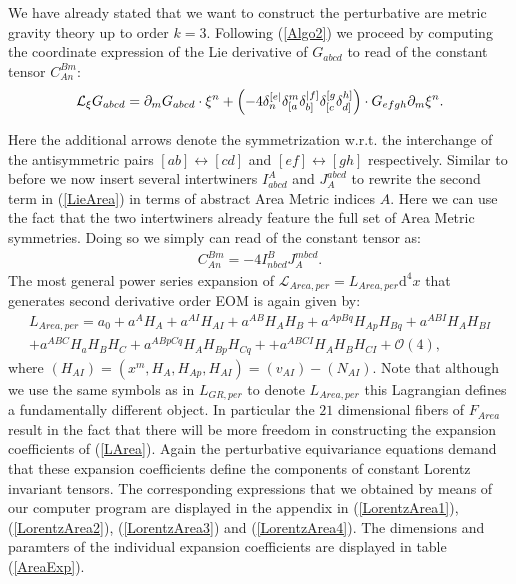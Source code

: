 \documentclass[a4paper,12pt, DIV=14, BCOR=5mm, twoside, headsepline, numbers=noenddot]{scrbook}
\newcommand{\mathnode}[1]{%
   \mathord{\tikz[baseline=(#1.base), inner sep = 0pt]{\node (#1) {$\scriptstyle{#1}$};}}}
\begin{document}
We have already stated that we want to construct the perturbative are metric gravity theory up to order $k=3$. Following (\ref{Algo2}) we proceed by computing the coordinate expression of the Lie derivative of $G_{abcd}$ to read of the constant tensor $C_{An}^{Bm}$:
\begin{align}\label{LieArea}
    \mathcal{L}_{\xi} G_{abcd} = \partial_m G_{abcd} \cdot \xi^n + \left (-4 \delta_n^{[e\vert} \delta_{[\mathnode{a}}^m \delta_{b]}^{\vert \mathnode{f} ]} \delta_{[c}^{[g} \delta_{\mathnode{d}]}^{\mathnode{h}]} \right ) \cdot G_{efgh} \partial_m \xi^n.
\end{align}
Here the additional arrows denote the symmetrization w.r.t. the interchange of the antisymmetric pairs $[ab] \leftrightarrow [cd]$ and $[ef] \leftrightarrow [gh]$ respectively.
%
%
%
Similar to before we now insert several intertwiners $I^A_{abcd}$ and $J_A^{abcd}$ to rewrite the second term in (\ref{LieArea}) in terms of abstract Area Metric indices $A$. Here we can use the fact that the two intertwiners already feature the full set of Area Metric symmetries.  Doing so we simply can read of the constant tensor as:
\begin{align}\label{areaGotayMInter}
    C_{An}^{Bm} = -4 I^B_{nbcd} J_A^{mbcd}.
\end{align}
The most general power series expansion of $\mathcal{L}_{Area,per} = L_{Area,per}\mathrm{d}^4x$ that generates second derivative order EOM is again given by:
\begin{align}\label{LArea}
    L_{Area,per} =  a_0 + a^A H_A + a^{AI}H_{AI} + a^{AB} H_{A}H_{B} + a^{ApBq} H_{Ap}H_{Bq} + a^{ABI} H_{A} H_{BI} \\
    + a^{ABC} H_a H_B H_C + a^{ABpCq} H_{A}H_{Bp}H_{Cq} +
    + a^{ABCI} H_A H_B H_{CI} 
    + \mathcal{O}(4),
\end{align}
where $(H_{AI}) = (x^m,H_A,H_{Ap},H_{AI}) = (v_{AI}) - (N_{AI})$. Note that although we use the same symbols as in $L_{GR,per}$ to denote $L_{Area,per}$ this Lagrangian defines a fundamentally different object. In particular the $21$ dimensional fibers of  $F_{Area}$ result in the fact that there will be more freedom in constructing the expansion coefficients of (\ref{LArea}). Again the perturbative equivariance equations demand that these expansion coefficients define the components of constant Lorentz invariant tensors. The corresponding expressions that we obtained by means of our computer program are displayed in the appendix in (\ref{LorentzArea1}), (\ref{LorentzArea2}), (\ref{LorentzArea3}) and (\ref{LorentzArea4}). The dimensions and paramters of the individual expansion coefficients are displayed in table (\ref{AreaExp}).
\end{document}
